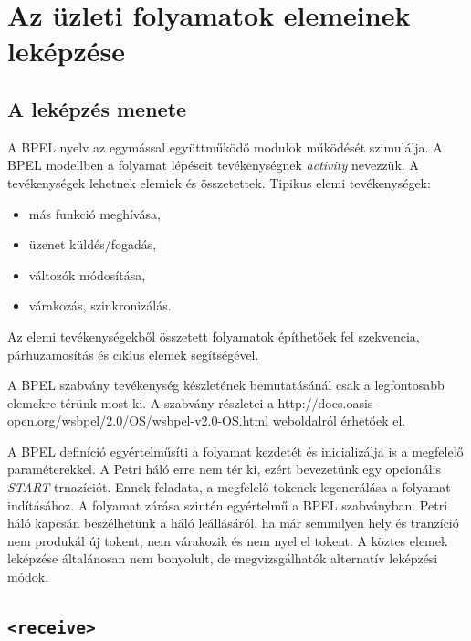 \chapter{Az üzleti folyamatok elemeinek leképzése}


\section{A leképzés menete}
A BPEL nyelv az egymással együttműködő modulok működését szimulálja. A BPEL  modellben a folyamat lépéseit tevékenységnek \textsl{activity} nevezzük. A tevékenységek lehetnek elemiek és összetettek. Tipikus elemi tevékenységek:
\begin{itemize}
\item más funkció meghívása,
\item üzenet küldés/fogadás,
\item változók módosítása,
\item várakozás, szinkronizálás.
\end{itemize}
Az elemi tevékenységekből összetett folyamatok építhetőek fel szekvencia, párhuzamosítás és ciklus elemek segítségével.

A BPEL szabvány tevékenység készletének bemutatásánál csak a legfontosabb elemekre térünk most ki. A szabvány részletei a
http://docs.oasis-open.org/wsbpel/2.0/OS/wsbpel-v2.0-OS.html weboldalról érhetőek el. 

A BPEL definíció egyértelműsíti a folyamat kezdetét és inicializálja is a megfelelő paraméterekkel. A Petri háló erre nem tér ki, ezért bevezetünk egy opcionális \textit{START} trnazíciót. Ennek feladata, a megfelelő tokenek legenerálása a folyamat indításához. A folyamat zárása szintén egyértelmű a BPEL szabványban. Petri háló kapcsán beszélhetünk a háló leállásáról, ha már semmilyen hely és tranzíció nem produkál új tokent, nem várakozik és nem nyel el tokent. A köztes elemek leképzése általánosan nem bonyolult, de megvizsgálhatók alternatív leképzési módok. 

\section{\texttt{<receive>}}

